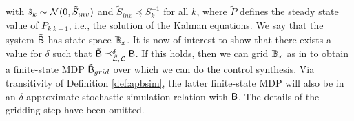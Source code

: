 \documentclass{ifacconf}
\begin{document}
with $ \tilde{s}_k\sim \mathcal{N} (0,\tilde{S}_{inv})$ and $\tilde{S}_{inv}\preceq S_k^{-1}$ for all $k$, where $\tilde P$ defines the steady state value of  $P_{k|k-1}$, i.e., the solution of the Kalman equations. We say that the system $\tilde {\mathsf{B}}$ has state space $\mathbb{B}_{x}$. It is now of interest to show that there exists a value for $\delta$ such that  $\tilde {\mathsf{B}}\preceq^\delta_{\tilde {\mathcal{L}},\mathcal{L}} \mathsf{B}$. If this holds, then we can grid $\mathbb{B}_x$ as in \citep{haesaert2017verification,tech_report_TACAS} to obtain a finite-state MDP $\tilde {\mathsf{B}}_{grid}$ over which we can do the control synthesis. Via transitivity of Definition \ref{def:apbsim}, the latter finite-state MDP will also be in an $\delta$-approximate stochastic simulation relation with $\mathsf{B}$. The details of the gridding step have been omitted.


%

\end{document}
